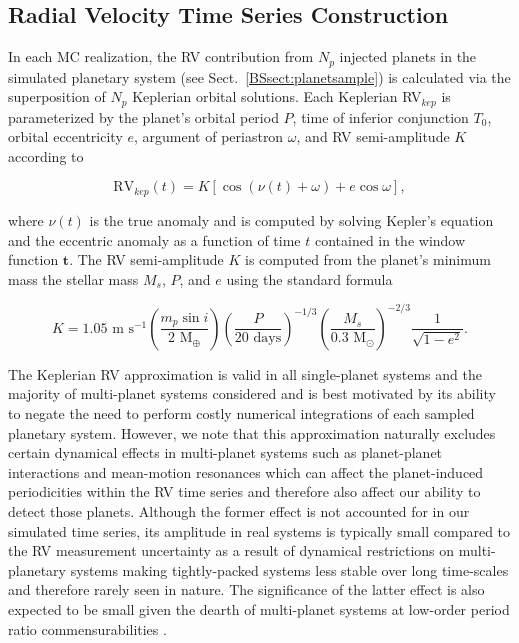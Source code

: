\subsection{Radial Velocity Time Series Construction} \label{BSsect:timeseries}
In each MC realization, 
the RV contribution from $N_p$ injected planets in the simulated planetary system (see Sect.~\ref{BSsect:planetsample})
is calculated via the superposition of $N_p$ Keplerian orbital solutions. Each Keplerian RV$_{kep}$ is parameterized by
the planet's orbital period $P$, time of inferior conjunction $T_0$, orbital eccentricity $e$,
argument of periastron $\omega$, and RV semi-amplitude $K$ according to

\begin{equation}
 \text{RV}_{kep}(t) = K [\cos{(\nu(t) +\omega)} + e \cos{\omega}],
\end{equation}

\noindent where $\nu(t)$ is the true anomaly and is computed by solving Kepler's equation
and the eccentric anomaly as a function of time $t$ contained in the window function
$\mathbf{t}$. The RV semi-amplitude $K$ is computed from the planet's minimum mass
\msini{,} the stellar mass $M_s$, $P$, and $e$ using the standard formula

\begin{equation}
  K = 1.05 \text{ m s}^{-1} \left(\frac{m_p\sin{i}}{2\text{ M}_{\oplus}} \right)
  \left( \frac{P}{20 \text{ days}} \right)^{-1/3} 
  \left( \frac{M_s}{0.3 \text{ M}_{\odot}} \right)^{-2/3}
  \frac{1}{\sqrt{1-e^2}}.
\end{equation}

The Keplerian RV approximation
is valid in all single-planet systems and the majority of multi-planet systems considered
and is best motivated by its ability to negate the
need to perform costly numerical integrations of each sampled planetary system. However, we note that
this approximation naturally excludes certain dynamical effects in multi-planet systems such as planet-planet
interactions and mean-motion resonances which can affect the planet-induced periodicities within
the RV time series and therefore also affect our ability to detect those planets.
Although the former effect is not accounted for in our simulated time series, its amplitude in real
systems is typically small compared to the RV measurement uncertainty as a result of dynamical restrictions
on multi-planetary systems making tightly-packed systems less stable over long time-scales and therefore
rarely seen in nature.
The significance of the latter effect is also expected to be small given the dearth of 
multi-planet systems at low-order period ratio commensurabilities \citep{lissauer11, fabrycky14}. \\

